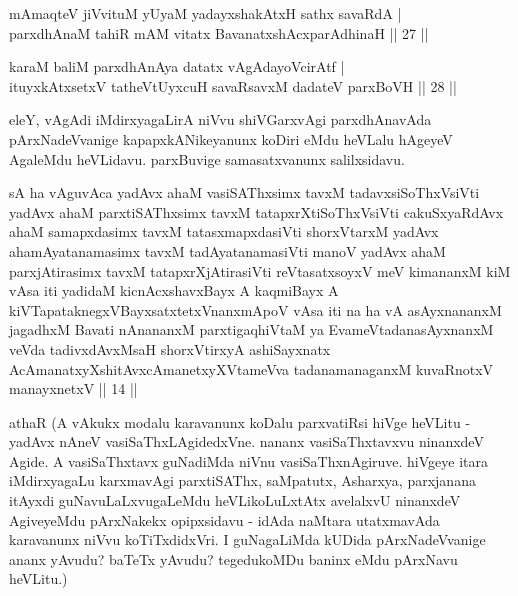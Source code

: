 
\begin{shl}
mAmaqteV jiVvituM yUyaM yadayxshakAtxH sathx savaRdA | \\
parxdhAnaM tahiR mAM vitatx BavanatxshAcxparAdhinaH \hfill|| 27 || 
\end{shl}

\begin{shl}
karaM baliM parxdhAnAya datatx vAgAdayoV\s cirAtf | \\
ituyxkAtxsetxV tatheVtUyxcuH savaRsavxM dadateV parxBoVH \hfill|| 28 || 
\end{shl}

\begin{artha}
eleY, vAgAdi iMdirxyagaLirA niVvu shiVGarxvAgi parxdhAnavAda 
pArxNadeVvanige kapapxkANikeyanunx koDiri eMdu heVLalu hAgeyeV AgaleMdu 
heVLidavu. parxBuvige samasatxvanunx salilxsidavu.
\end{artha}


\begin{shl}
sA ha vAguvAca yadAvx ahaM vasiSAThxsimx tavxM tadavxsiSoThxV\s siVti yadAvx ahaM parxtiSAThxsimx tavxM tatapxrXtiSoThxV\s siVti cakuSxyaRdAvx ahaM samapxdasimx tavxM tatasxmapxdasiVti shorxVtarxM yadAvx ahamAyatanamasimx tavxM tadAyatanamasiVti manoV yadAvx ahaM parxjAtirasimx tavxM tatapxrXjAtirasiVti reVtasatxsoyxV meV kimananxM kiM vAsa iti yadidaM kicnAcxshavxBayx A kaqmiBayx A kiVTapataknegxVBayxsatxtetxV\s nanxmApoV vAsa iti na ha vA asAyxnananxM jagadhxM Bavati nAnananxM parxtigaqhiVtaM ya EvameVtadanasAyxnanxM veVda tadivxdAvxMsaH shorxVtirxyA ashiSayxnatx AcAmanatxyXshitAvxcAmanetxyXVtameVva tadanamanaganxM kuvaRnotxV manayxnetxV || 14 ||
\end{shl}

\begin{artha}
athaR (A vAkukx modalu karavanunx koDalu parxvatiRsi hiVge heVLitu - 
yadAvx nAneV vasiSaThxLAgidedxVne. nananx vasiSaThxtavxvu ninanxdeV 
Agide. A vasiSaThxtavx guNadiMda niVnu vasiSaThxnAgiruve. hiVgeye 
itara iMdirxyagaLu karxmavAgi parxtiSAThx, saMpatutx, Asharxya, 
parxjanana itAyxdi guNavuLaLxvugaLeMdu heVLikoLuLxtAtx avelalxvU 
ninanxdeV AgiveyeMdu pArxNakekx opipxsidavu - idAda naMtara utatxmavAda 
karavanunx niVvu koTiTxdidxVri. I guNagaLiMda kUDida pArxNadeVvanige 
ananx yAvudu? baTeTx yAvudu? tegedukoMDu baninx eMdu pArxNavu heVLitu.)
\end{artha}

